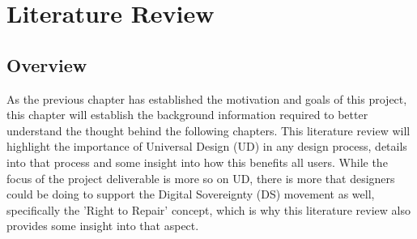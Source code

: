 
\chapter{Literature Review} %

\label{Chapter2} %


\section{Overview} %

As the previous chapter has established the motivation and goals of this project, this chapter will establish the background information required to better understand the thought behind the following chapters.
This literature review will highlight the importance of Universal Design (UD) in any design process, details into that process and some insight into how this benefits all users.
While the focus of the project deliverable is more so on UD, there is more that designers could be doing to support the Digital Sovereignty (DS) movement as well, specifically the 'Right to Repair' concept, which is why this literature review also provides some insight into that aspect.


